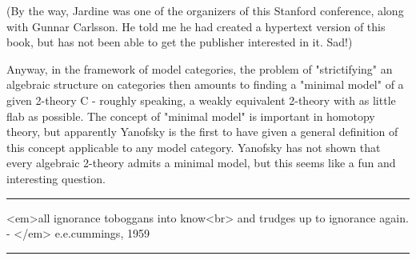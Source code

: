 (By the way, Jardine was one of the organizers of this Stanford conference, 
along with Gunnar Carlsson.  He told me he had created a hypertext version 
of this book, but has not been able to get the publisher interested in it.  
Sad!)

Anyway, in the framework of model categories, the problem of "strictifying" 
an algebraic structure on categories then amounts to finding a "minimal 
model" of a given 2-theory C - roughly speaking, a weakly equivalent 
2-theory with as little flab as possible.  The concept of "minimal model" 
is important in homotopy theory, but apparently Yanofsky is the first to 
have given a general definition of this concept applicable to any model 
category.  Yanofsky has not shown that every algebraic 2-theory admits a 
minimal model, but this seems like a fun and interesting question.



 \par\noindent\rule{\textwidth}{0.4pt}
<em>all ignorance toboggans into know<br>
and trudges up to ignorance again. - </em> e.e.cummings, 1959
\par\noindent\rule{\textwidth}{0.4pt}

